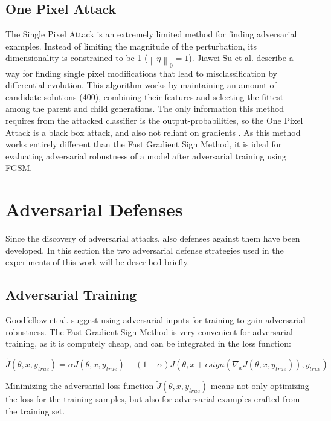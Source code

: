 \documentclass[draft,final]{vutinfth} %
\newcommand{\norm}[1]{\left\lVert#1\right\rVert}
\begin{document}
\subsection{One Pixel Attack}

The Single Pixel Attack is an extremely limited method for finding adversarial examples.
Instead of limiting the magnitude of the perturbation, its dimensionality is constrained to be 1 ($\norm{\eta}_0=1$).
Jiawei Su et al. describe a way for finding single pixel modifications that lead to misclassification by differential evolution.
This algorithm works by maintaining an amount of candidate solutions (400), combining their features and selecting the fittest among the parent and child generations.
The only information this method requires from the attacked classifier is the output-probabilities, so the One Pixel Attack is a black box attack, and also not reliant on gradients \cite{Jiawei2017}.
As this method works entirely different than the Fast Gradient Sign Method, it is ideal for evaluating adversarial robustness of a model after adversarial training using FGSM.

\section{Adversarial Defenses}

Since the discovery of adversarial attacks, also defenses against them have been developed.
In this section the two adversarial defense strategies used in the experiments of this work will be described briefly.

\subsection{Adversarial Training}

Goodfellow et al. suggest using adversarial inputs for training to gain adversarial robustness.
The Fast Gradient Sign Method is very convenient for adversarial training, as it is computely cheap, and can be integrated in the loss function:

\begin{equation}
	\label{eq:adv_loss}
	\tilde{J}(\theta, x, y_{true}) = \alpha J(\theta, x, y_{true}) + (1-\alpha)J(\theta, x + \epsilon sign(\nabla_xJ(\theta, x, y_{true})), y_{true})
\end{equation}

Minimizing the adversarial loss function $\tilde{J}(\theta, x, y_{true})$ means not only optimizing the loss for the training samples, but also for adversarial examples crafted from the training set.
\cite{Goodfellow2015}
\end{document}
